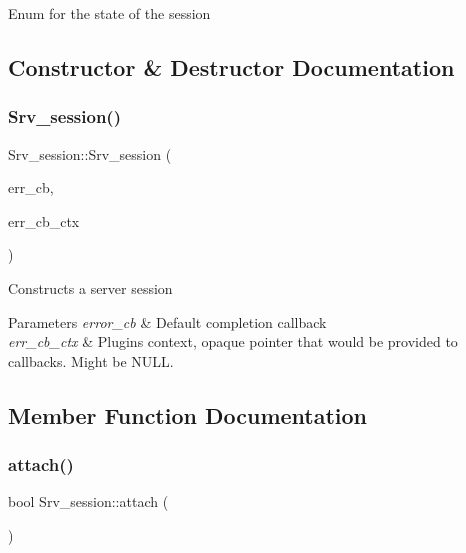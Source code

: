 Enum for the state of the session 

\subsection{Constructor \& Destructor Documentation}
\mbox{\label{classSrv__session_a3f79b456c9e365806f12ee5aa67bfbcb}} 
\subsubsection{\texorpdfstring{Srv\+\_\+session()}{Srv\_session()}}
{\footnotesize\ttfamily Srv\+\_\+session\+::\+Srv\+\_\+session (\begin{DoxyParamCaption}\item[{srv\+\_\+session\+\_\+error\+\_\+cb}]{err\+\_\+cb,  }\item[{void $\ast$}]{err\+\_\+cb\+\_\+ctx }\end{DoxyParamCaption})}

Constructs a server session


\begin{DoxyParams}{Parameters}
{\em error\+\_\+cb} & Default completion callback \\
\hline
{\em err\+\_\+cb\+\_\+ctx} & Plugin\textquotesingle{}s context, opaque pointer that would be provided to callbacks. Might be N\+U\+LL. \\
\hline
\end{DoxyParams}


\subsection{Member Function Documentation}
\mbox{\label{classSrv__session_a73df8d1a4af78c58ffaacb6097ccf74d}} 
\subsubsection{\texorpdfstring{attach()}{attach()}}
{\footnotesize\ttfamily bool Srv\+\_\+session\+::attach (\begin{DoxyParamCaption}{ }\end{DoxyParamCaption})}

